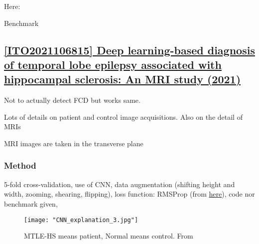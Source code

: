 Here: 

\begin{table}[htbp]
	\centering
	\caption{Benchmark}

	\caption{Results from }
	\label{tab:res5}
\end{table}

\newpage
\subsection{\href{https://www.sciencedirect.com/science/article/pii/S0920121121002709\#sec0010}{[ITO2021106815] Deep learning-based diagnosis of temporal lobe epilepsy associated with hippocampal sclerosis: An MRI study (2021) }}
\label{res6}

Not to actually detect FCD but works same.

Lots of details on patient and control image acquisitions.
Also on the detail of MRIs

MRI images are taken in the transverse plane

\subsubsection{Method}

5-fold cross-validation, 
use of CNN, 
data augmentation (shifting height and width, zooming, shearing, flipping),
loss function: RMSProp (from \href{https://www.sciencedirect.com/science/article/pii/S0920121121002709\#bib21}{here}),
code nor benchmark given,

\begin{figure}[htbp]
	\centering
	\texttt{[image: "CNN\_explanation\_3.jpg"]}
	\caption{MTLE-HS means patient, Normal means control. From }
\end{figure}

